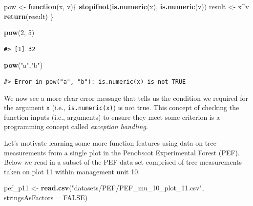 \documentclass[
  11pt,
]{krantz}
\newenvironment{Shaded}{\begin{snugshade}}{\end{snugshade}}
\newcommand{\ControlFlowTok}[1]{\textcolor[rgb]{0.13,0.29,0.53}{\textbf{#1}}}
\newcommand{\DataTypeTok}[1]{\textcolor[rgb]{0.13,0.29,0.53}{#1}}
\newcommand{\DecValTok}[1]{\textcolor[rgb]{0.00,0.00,0.81}{#1}}
\newcommand{\KeywordTok}[1]{\textcolor[rgb]{0.13,0.29,0.53}{\textbf{#1}}}
\newcommand{\NormalTok}[1]{#1}
\newcommand{\OperatorTok}[1]{\textcolor[rgb]{0.81,0.36,0.00}{\textbf{#1}}}
\newcommand{\OtherTok}[1]{\textcolor[rgb]{0.56,0.35,0.01}{#1}}
\newcommand{\StringTok}[1]{\textcolor[rgb]{0.31,0.60,0.02}{#1}}
\theoremstyle{definition}
\theoremstyle{definition}
\theoremstyle{definition}
\theoremstyle{definition}
\theoremstyle{remark}
\begin{document}
\begin{Shaded}
\begin{Highlighting}[]
\NormalTok{pow \textless{}{-}}\StringTok{ }\ControlFlowTok{function}\NormalTok{(x, v)\{}
  \KeywordTok{stopifnot}\NormalTok{(}\KeywordTok{is.numeric}\NormalTok{(x), }\KeywordTok{is.numeric}\NormalTok{(v))}
\NormalTok{  result \textless{}{-}}\StringTok{ }\NormalTok{x}\OperatorTok{\^{}}\NormalTok{v}
  \KeywordTok{return}\NormalTok{(result)}
\NormalTok{\}}

\KeywordTok{pow}\NormalTok{(}\DecValTok{2}\NormalTok{, }\DecValTok{5}\NormalTok{)}
\end{Highlighting}
\end{Shaded}

\begin{verbatim}
#> [1] 32
\end{verbatim}

\begin{Shaded}
\begin{Highlighting}[]
\KeywordTok{pow}\NormalTok{(}\StringTok{"a"}\NormalTok{,}\StringTok{"b"}\NormalTok{)}
\end{Highlighting}
\end{Shaded}

\begin{verbatim}
#> Error in pow("a", "b"): is.numeric(x) is not TRUE
\end{verbatim}

We now see a more clear error message that tells us the condition we required for the argument \texttt{x} (i.e., \texttt{is.numeric(x)}) is not true. This concept of checking the function inputs (i.e., arguments) to ensure they meet some criterion is a programming concept called \emph{exception handling}.

Let's motivate learning some more function features using data on tree measurements from a single plot in the Penobscot Experimental Forest (PEF). Below we read in a subset of the PEF data set comprised of tree measurements taken on plot 11 within management unit 10.

\begin{Shaded}
\begin{Highlighting}[]
\NormalTok{pef\_p11 \textless{}{-}}\StringTok{ }\KeywordTok{read.csv}\NormalTok{(}\StringTok{"datasets/PEF/PEF\_mu\_10\_plot\_11.csv"}\NormalTok{, }\DataTypeTok{stringsAsFactors =} \OtherTok{FALSE}\NormalTok{)}
\end{Highlighting}
\end{Shaded}
\end{document}
